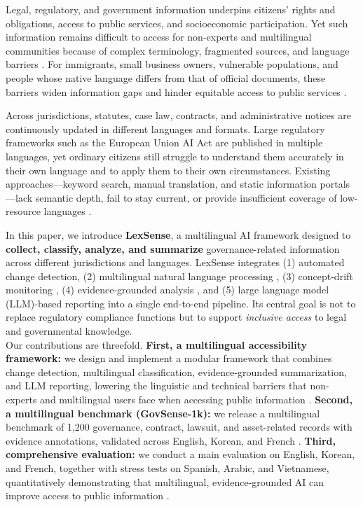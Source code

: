 {}{%
Legal, regulatory, and government information underpins citizens' rights and obligations, access to public services, and socioeconomic participation. Yet such information remains difficult to access for non-experts and multilingual communities because of complex terminology, fragmented sources, and language barriers \cite{zhong2020legalai, chalkidis2020legalbert}. For immigrants, small business owners, vulnerable populations, and people whose native language differs from that of official documents, these barriers widen information gaps and hinder equitable access to public services \cite{aletras2016echr}.

Across jurisdictions, statutes, case law, contracts, and administrative notices are continuously updated in different languages and formats. Large regulatory frameworks such as the European Union AI Act \cite{EUAIAct2024} are published in multiple languages, yet ordinary citizens still struggle to understand them accurately in their own language and to apply them to their own circumstances. Existing approaches---keyword search, manual translation, and static information portals---lack semantic depth, fail to stay current, or provide insufficient coverage of low-resource languages \cite{niklaus2023multilegal}.

In this paper, we introduce \textbf{LexSense}, a multilingual AI framework designed to \textbf{collect, classify, analyze, and summarize} governance-related information across different jurisdictions and languages. LexSense integrates (1) automated change detection, (2) multilingual natural language processing \cite{conneau2020xlmr, xue2021mt5}, (3) concept-drift monitoring \cite{gama2014drift}, (4) evidence-grounded analysis \cite{lewis2020rag}, and (5) large language model (LLM)-based reporting \cite{openai2023gpt4, touvron2023llama2} into a single end-to-end pipeline. Its central goal is not to replace regulatory compliance functions but to support \emph{inclusive access} to legal and governmental knowledge.
~\\
Our contributions are threefold.
\textbf{First, a multilingual accessibility framework:} we design and implement a modular framework that combines change detection, multilingual classification, evidence-grounded summarization, and LLM reporting, lowering the linguistic and technical barriers that non-experts and multilingual users face when accessing public information \cite{devlin2019bert, reimers2020multilingual}.
\textbf{Second, a multilingual benchmark (GovSense-1k):} we release a multilingual benchmark of 1,200 governance, contract, lawsuit, and asset-related records with evidence annotations, validated across English, Korean, and French \cite{chalkidis2022lexglue, hendrycks2021cuad}.
\textbf{Third, comprehensive evaluation:} we conduct a main evaluation on English, Korean, and French, together with stress tests on Spanish, Arabic, and Vietnamese, quantitatively demonstrating that multilingual, evidence-grounded AI can improve access to public information \cite{nllb2022, hu2020xtreme}.

}
